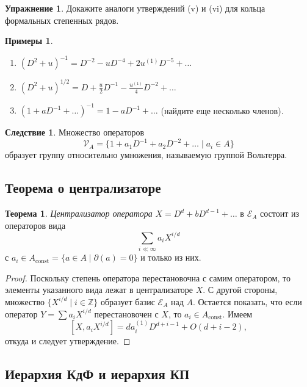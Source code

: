 \documentclass{article}
\theoremstyle{definition}
\newtheorem{theorem}{Теорема}[section]
\theoremstyle{definition} %
\theoremstyle{remark}     %
\theoremstyle{definition}
\theoremstyle{definition}
\newtheorem*{corollary}{Следствие}
\theoremstyle{definition}
\theoremstyle{definition}
\theoremstyle{definition}
\theoremstyle{definition}
\theoremstyle{definition}
\newtheorem*{examples}{Примеры}
\theoremstyle{definition}
\newtheorem{exercise}{Упражнение}[section]
\begin{document}
\begin{exercise} Докажите аналоги утверждений (v) и (vi) для кольца формальных степенных рядов.
\end{exercise}

\begin{examples} \hfill
\begin{enumerate}[1.]
\item \((D^2 + u)^{-1} = D^{-2} - uD^{-4} + 2u^{(1)}D^{-5} + \dots\)
\item \((D^2 + u)^{1/2} = D + \frac{u}{2}D^{-1} - \frac{u^{(1)}}{4}D^{-2} + \dots\)
\item \((1 + aD^{-1} + \dots)^{-1} = 1 - aD^{-1} + \dots\) (найдите еще несколько членов).
\end{enumerate}
\end{examples}

\begin{corollary}Множество операторов
\[
\mathcal{V}_A = \{1 + a_1D^{-1} + a_2D^{-2} + \dots \mid a_i \in A\}
\]
образует группу относительно умножения, называемую группой Вольтерра.
\end{corollary}




\subsection{Теорема о централизаторе}

\begin{theorem}
\emph{Централизатор оператора} \( X = D^d + bD^{d-1} + \dots \) в \(\mathcal{E}_A\) состоит из операторов вида
\[
\sum_{i \ll \infty} a_i X^{i/d}
\]
с \(a_i \in A_{\text{const}} = \{a \in A \mid \partial(a) = 0\}\) и только из них.
\end{theorem}

\begin{proof}
Поскольку степень оператора перестановочна с самим оператором, то элементы указанного вида лежат в централизаторе \( X \). С другой стороны, множество \(\{X^{i/d} \mid i \in \mathbb{Z}\}\) образует базис \(\mathcal{E}_A\) над \( A \). Остается показать, что если оператор \( Y = \sum a_i X^{i/d} \) перестановочен с \( X \), то \( a_i \in A_{\text{const}} \). Имеем
\[
[X, a_i X^{i/d}] = d a_i^{(1)} D^{d+i-1} + O(d+i-2),
\]
откуда и следует утверждение.
\end{proof}



\subsection{Иерархия КдФ и иерархия КП}
\end{document}
